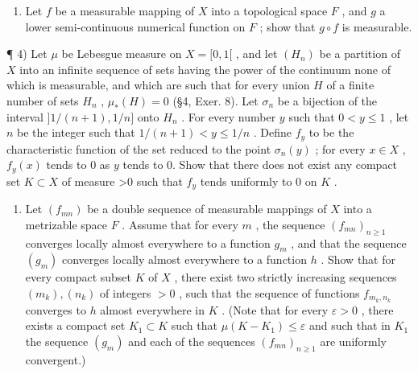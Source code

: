 \begin{enumerate}
\def\labelenumi{\arabic{enumi})}
\setcounter{enumi}{2}
\tightlist
\item
  Let \(f\) be a measurable mapping of \(X\) into a topological space \(F\) , and \(g\) a lower semi-continuous numerical function on \(F\) ; show that \(g \circ f\) is measurable.
\end{enumerate}

¶ 4) Let \(\mu\) be Lebesgue measure on \(X = [0,1[\) , and let \((H_n)\) be a partition of \(X\) into an infinite sequence of sets having the power of the continuum none of which is measurable, and which are such that for every union \(H\) of a finite number of sets \(H_n\) , \(\mu_*(H) = 0\) (§4, Exer. 8). Let \(\sigma_n\) be a bijection of the interval \(]1/(n+1),1/n]\) onto \(H_n\) . For every number \(y\) such that \(0 < y \leqslant 1\) , let \(n\) be the integer such that \(1/(n+1) < y \leqslant 1/n\) . Define \(f_y\) to be the characteristic function of the set reduced to the point \(\sigma_n(y)\) ; for every \(x \in X\) , \(f_y(x)\) tends to 0 as \(y\) tends to 0. Show that there does not exist any compact set \(K \subset X\) of measure \textgreater0 such that \(f_y\) tends uniformly to 0 on \(K\) .

\begin{enumerate}
\def\labelenumi{\arabic{enumi})}
\setcounter{enumi}{4}
\tightlist
\item
  Let \((f_{mn})\) be a double sequence of measurable mappings of \(X\) into a metrizable space \(F\) . Assume that for every \(m\) , the sequence \((f_{mn})_{n\geqslant 1}\) converges locally almost everywhere to a function \(g_{m}\) , and that the sequence \((g_{m})\) converges locally almost everywhere to a function \(h\) . Show that for every compact subset \(K\) of \(X\) , there exist two strictly increasing sequences \((m_k),(n_k)\) of integers \(>0\) , such that the sequence of functions \(f_{m_k,n_k}\) converges to \(h\) almost everywhere in \(K\) . (Note that for every \(\varepsilon >0\) , there exists a compact set \(K_1\subset K\) such that \(\mu (K - K_1)\leqslant \varepsilon\) and such that in \(K_{1}\) the sequence \((g_{m})\) and each of the sequences \((f_{mn})_{n\geqslant 1}\) are uniformly convergent.)
\end{enumerate}

